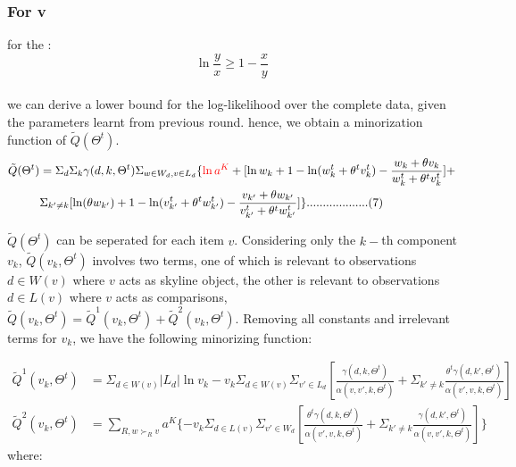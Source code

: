 \documentclass{article}
\begin{document}
\subsubsection{For v}
for the :
\begin{equation*}
\ln \frac{y}{x} \geq 1- \frac{x}{y}
\end{equation*}\\
we can derive a lower bound for the log-likelihood over the complete data, given the parameters learnt from previous round.
hence, we obtain a minorization function of $\tilde{Q}(\Theta^t)$.\\
\begin{equation}
\begin{aligned}
\tilde{Q}(\Theta^t) &=\Sigma_d \Sigma_k \gamma(d,k,\Theta^t) \Sigma_{w\in W_d, v\in L_d}  \{\textcolor{red}{\ln a^K} + [\ln w_k + 1 - \ln (w_k^t + \theta^t v_k^t) - \frac{w_k+\theta v_k}{w_k^t + \theta^tv_k^t}]+\\\nonumber
&\Sigma_{k'\neq k} [\ln (\theta w_{k'}) + 1 - \ln (v_{k'}^t + \theta^t w_{k'}^t) -  \frac{v_{k'}+\theta w_{k'}}{v_{k'}^t + \theta^t w_{k'}^t}]
\} ...................(7)
\end{aligned}
\end{equation}


 $\tilde{Q}(\Theta^t)$ can be seperated for each item $v$. Considering only the $k-$th component $v_k$, $\tilde{Q}(v_k,\Theta^t)$ involves two terms, one of which is relevant to observations $d\in W(v)$ where $v$ acts as skyline object, the other is relevant to observations $d \in L(v)$ where $v$ acts as comparisons, $\tilde{Q}(v_k,\Theta^t)=\tilde{Q}^1(v_k,\Theta^t)+\tilde{Q}^2(v_k,\Theta^t)$. Removing all constants and irrelevant terms for $v_k$, we have the following minorizing function:


\begin{equation}
\begin{aligned}
\tilde{Q}^1(v_k,\Theta^t) & =\Sigma_{d\in W(v)} |L_d| \ln v_k -v_k\Sigma_{d\in W(v)}\Sigma_{v'\in L_d} [\frac{\gamma(d,k,\Theta^t)}{ \alpha(v,v',k,\Theta^t)} +\Sigma_{k'\neq k}\frac{\theta^t\gamma(d,k',\Theta^t)}{\alpha(v',v,k,\Theta^t)}]\\ \nonumber
\tilde{Q}^2(v_k,\Theta^t) & =\sum_{R,w \succ_R v} a^K \{ -v_k \Sigma_{d\in L(v)}\Sigma_{v'\in W_d} [\frac{\theta^t \gamma(d,k,\Theta^t)}{\alpha(v',v,k,\Theta^t)}+\Sigma_{k'\neq k} \frac{\gamma(d,k',\Theta^t)}{\alpha(v,v',k,\Theta^t)}]\}
\end{aligned}
\end{equation}
 where:\\
\end{document}
